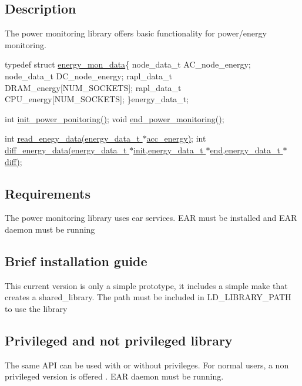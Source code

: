 \subsection*{Description }

The power monitoring library offers basic functionality for power/energy monitoring.

typedef struct \hyperlink{structenergy__mon__data}{energy\+\_\+mon\+\_\+data}\{ node\+\_\+data\+\_\+t A\+C\+\_\+node\+\_\+energy; node\+\_\+data\+\_\+t D\+C\+\_\+node\+\_\+energy; rapl\+\_\+data\+\_\+t D\+R\+A\+M\+\_\+energy\mbox{[}N\+U\+M\+\_\+\+S\+O\+C\+K\+E\+TS\mbox{]}; rapl\+\_\+data\+\_\+t C\+P\+U\+\_\+energy\mbox{[}N\+U\+M\+\_\+\+S\+O\+C\+K\+E\+TS\mbox{]}; \}energy\+\_\+data\+\_\+t;

int \hyperlink{power__metrics_8c_af5eefcde30c84634efe6cfb8b156f89d}{init\+\_\+power\+\_\+ponitoring()}; void \hyperlink{power__metrics_8c_affbb71e4b3e13f4786c527424c70cde2}{end\+\_\+power\+\_\+monitoring()};

int \hyperlink{power__metrics_8h_aa934a380c9799cc51aa3617c3e288921}{read\+\_\+enegy\+\_\+data(energy\+\_\+data\+\_\+t $\ast$acc\+\_\+energy)}; int \hyperlink{power__metrics_8h_a4c501a33975a5e054f4bb470dd03cc38}{diff\+\_\+energy\+\_\+data(energy\+\_\+data\+\_\+t $\ast$init,energy\+\_\+data\+\_\+t $\ast$end,energy\+\_\+data\+\_\+t $\ast$diff)};

\subsection*{Requirements }

The power monitoring library uses ear services. E\+AR must be installed and E\+AR daemon must be running

\subsection*{Brief installation guide }

This current version is only a simple prototype, it includes a simple make that creates a shared\+\_\+library. The path must be included in L\+D\+\_\+\+L\+I\+B\+R\+A\+R\+Y\+\_\+\+P\+A\+TH to use the library

\subsection*{Privileged and not privileged library }

The same A\+PI can be used with or without privileges. For normal users, a non privileged version is offered . E\+AR daemon must be running.

